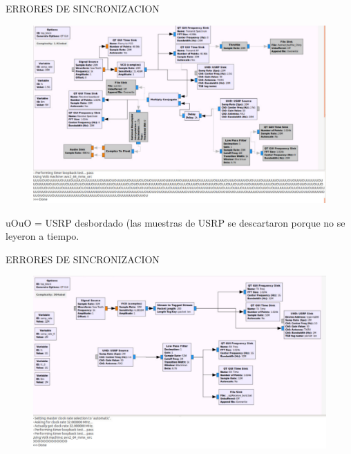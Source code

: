 \begin{frame}{ERRORES DE SINCRONIZACION}

\begin{figure}
\begin{center}
\vspace{-8mm}
\includegraphics[width=\textwidth, height=0.6\paperheight]{parte1/lab4/pdf/OUOU.pdf}
\end{center}
\end{figure}
\vspace{-5mm}

uOuO = USRP desbordado (las muestras de USRP se descartaron porque no se leyeron a tiempo.\\ \vspace{2mm}

\end{frame}
\begin{frame}{ERRORES DE SINCRONIZACION}

\begin{figure}
\begin{center}
\vspace{-8mm}
\includegraphics[width=\textwidth, height=0.6\paperheight]{parte1/lab4/pdf/OOO.pdf}
\end{center}
\end{figure}
\vspace{-5mm}


\end{frame}

